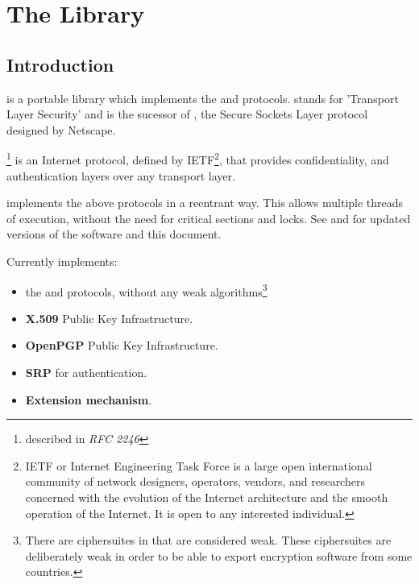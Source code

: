 \documentclass{book}
\begin{document}



\tableofcontents
\newpage
{}
\pagestyle{fancy}

\chapter{The Library}
\section{Introduction}
\par
\gnutls{} is a portable library which implements the \tlsI{} and 
\sslIII{} protocols.
\tls{} stands for 'Transport Layer Security' and is the sucessor of \ssl{}, 
the Secure Sockets Layer protocol designed by Netscape. 

\tlsI{}\footnote{described in {\it RFC 2246}} is an Internet protocol,
defined by {IETF}\footnote{IETF or Internet Engineering Task Force 
is a large open international community of network
designers, operators, vendors, and researchers concerned with the evolution of 
the Internet architecture and the smooth operation of the Internet. It is open to any interested individual.}, 
that provides confidentiality, and authentication layers over any
transport layer.

\par
\gnutls{} implements the above
protocols in a reentrant way. This allows multiple threads of
execution, without the need for critical sections and locks. See
and  
for updated versions of the \gnutls{} software and this document.

\par
Currently \gnutls{} implements:
\begin{itemize}
 \item the \tlsI{} and \sslIII{} protocols, without any weak algorithms\footnote{
There are ciphersuites in \tlsI{} that are considered weak. These
ciphersuites are deliberately weak in order to be able to export encryption
software from some countries.}
 \item {\bf X.509} Public Key Infrastructure.
 \item {\bf OpenPGP} Public Key Infrastructure.
 \item {\bf SRP} for \tls{} authentication.
 \item \tls{} {\bf Extension mechanism}.
\end{itemize}
\end{document}
